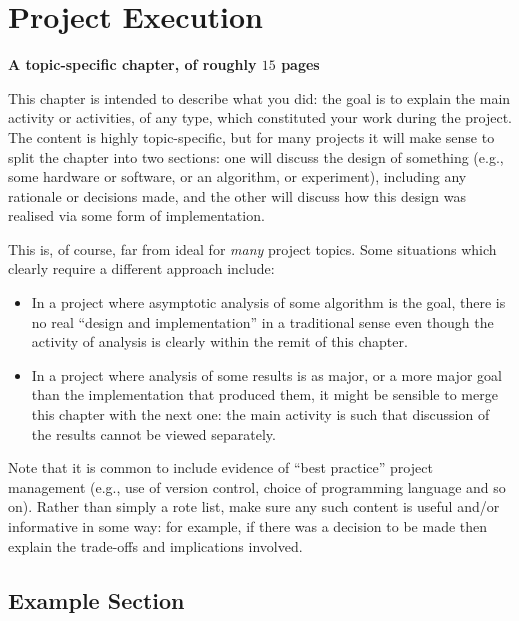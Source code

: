 \documentclass[ %
                    author={Dillon Keith Diep},
                supervisor={Dr. Carl Henrik Ek},
                    degree={MEng},
                     title={Assisted Content Generation for 3D Hair Geometry},
                  subtitle={[INCOMPLETE DRAFT, CONTAINS NOTES FROM RESEARCH]},
                      type={Research},
                      year={2014} ]{dissertation}
\begin{document}

\chapter{Project Execution}
\label{chap:execution}

{\bf A topic-specific chapter, of roughly $15$ pages} 
\vspace{1cm} 

\noindent
This chapter is intended to describe what you did: the goal is to explain
the main activity or activities, of any type, which constituted your work 
during the project.  The content is highly topic-specific, but for many 
projects it will make sense to split the chapter into two sections: one 
will discuss the design of something (e.g., some hardware or software, or 
an algorithm, or experiment), including any rationale or decisions made, 
and the other will discuss how this design was realised via some form of 
implementation.  

This is, of course, far from ideal for {\em many} project topics.  Some
situations which clearly require a different approach include:

\begin{itemize}
\item In a project where asymptotic analysis of some algorithm is the goal,
      there is no real ``design and implementation'' in a traditional sense
      even though the activity of analysis is clearly within the remit of
      this chapter.
\item In a project where analysis of some results is as major, or a more
      major goal than the implementation that produced them, it might be
      sensible to merge this chapter with the next one: the main activity 
      is such that discussion of the results cannot be viewed separately.
\end{itemize}

\noindent
Note that it is common to include evidence of ``best practice'' project 
management (e.g., use of version control, choice of programming language 
and so on).  Rather than simply a rote list, make sure any such content 
is useful and/or informative in some way: for example, if there was a 
decision to be made then explain the trade-offs and implications 
involved.

\section{Example Section}
\end{document}
